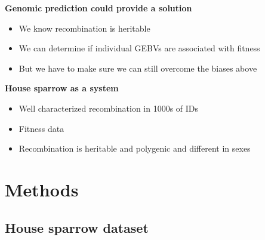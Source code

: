 \documentclass[dvipsnames]{article}
\begin{document}
\textbf{Genomic prediction could provide a solution}
\begin{itemize}
    \item We know recombination is heritable
    \item We can determine if individual GEBVs are associated with fitness
    \item But we have to make sure we can still overcome the biases above
\end{itemize}

\textbf{House sparrow as a system}
\begin{itemize}
    \item Well characterized recombination in 1000s of IDs
    \item Fitness data
    \item Recombination is heritable and polygenic and different in sexes
\end{itemize}

\section*{Methods}

\subsection*{House sparrow dataset}
\end{document}
